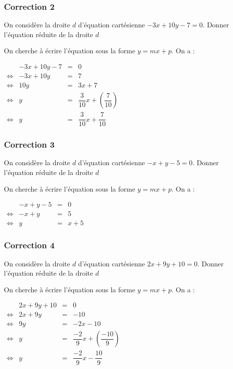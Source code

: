 \documentclass[15pt, mathserif]{beamer}
\begin{document}
\begin{frame}
\vspace{-10mm}
	\frametitle{Correction 2}
On considère la droite $d$ d'équation cartésienne $-3x+10y-7=0$. Donner l'équation réduite de la droite $d$ 
 
  \bigskip 
 
 On cherche à écrire l'équation sous la forme $y=mx+p$. On a : 
 
 \hfil $\begin{array}{crcl} 
 & -3x+10y-7&=&0 \\ 
 \Leftrightarrow & -3x+10y & =&7\\ 
 \Leftrightarrow & 10y &=&3x+7\\ 
 \Leftrightarrow & y &=& \dfrac{3}{10}x +\left( \dfrac{7}{10} \right)\\ 
 \Leftrightarrow & y &=&\dfrac{3}{10}x +\dfrac{7}{10}\end{array}$ 
 
 \end{frame}


\begin{frame}
\vspace{-10mm}
	\frametitle{Correction 3}
On considère la droite $d$ d'équation cartésienne $-x+y-5=0$. Donner l'équation réduite de la droite $d$ 
 
  \bigskip 
 
 On cherche à écrire l'équation sous la forme $y=mx+p$. On a : 
 
 \hfil $\begin{array}{crcl} 
 & -x+y-5&=&0 \\ 
 \Leftrightarrow & -x+y & =&5\\ 
 \Leftrightarrow & y &=&x+5\end{array}$ 
 
 \end{frame}


\begin{frame}
\vspace{-10mm}
	\frametitle{Correction 4}
On considère la droite $d$ d'équation cartésienne $2x+9y+10=0$. Donner l'équation réduite de la droite $d$ 
 
  \bigskip 
 
 On cherche à écrire l'équation sous la forme $y=mx+p$. On a : 
 
 \hfil $\begin{array}{crcl} 
 & 2x+9y+10&=&0 \\ 
 \Leftrightarrow & 2x+9y & =&-10\\ 
 \Leftrightarrow & 9y &=&-2x-10\\ 
 \Leftrightarrow & y &=& \dfrac{-2}{9}x +\left( \dfrac{-10}{9} \right)\\ 
 \Leftrightarrow & y &=&\dfrac{-2}{9}x -\dfrac{10}{9}\end{array}$ 
 
 \end{frame}
\end{document}

